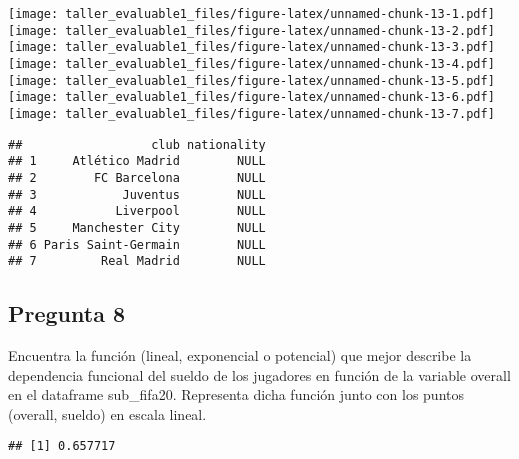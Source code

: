 \documentclass[
]{article}
\newenvironment{Shaded}{\begin{snugshade}}{\end{snugshade}}
\newcommand{\KeywordTok}[1]{\textcolor[rgb]{0.13,0.29,0.53}{\textbf{#1}}}
\newcommand{\NormalTok}[1]{#1}
\newcommand{\OperatorTok}[1]{\textcolor[rgb]{0.81,0.36,0.00}{\textbf{#1}}}
\begin{document}
\texttt{[image: taller\_evaluable1\_files/figure-latex/unnamed-chunk-13-1.pdf]}
\texttt{[image: taller\_evaluable1\_files/figure-latex/unnamed-chunk-13-2.pdf]}
\texttt{[image: taller\_evaluable1\_files/figure-latex/unnamed-chunk-13-3.pdf]}
\texttt{[image: taller\_evaluable1\_files/figure-latex/unnamed-chunk-13-4.pdf]}
\texttt{[image: taller\_evaluable1\_files/figure-latex/unnamed-chunk-13-5.pdf]}
\texttt{[image: taller\_evaluable1\_files/figure-latex/unnamed-chunk-13-6.pdf]}
\texttt{[image: taller\_evaluable1\_files/figure-latex/unnamed-chunk-13-7.pdf]}

\begin{verbatim}
##                  club nationality
## 1     Atlético Madrid        NULL
## 2        FC Barcelona        NULL
## 3            Juventus        NULL
## 4           Liverpool        NULL
## 5     Manchester City        NULL
## 6 Paris Saint-Germain        NULL
## 7         Real Madrid        NULL
\end{verbatim}

\hypertarget{pregunta-8}{%
\subsection{Pregunta 8}\label{pregunta-8}}

Encuentra la función (lineal, exponencial o potencial) que mejor
describe la dependencia funcional del sueldo de los jugadores en función
de la variable overall en el dataframe sub\_fifa20. Representa dicha
función junto con los puntos (overall, sueldo) en escala lineal.

\begin{Shaded}
\end{Shaded}

\begin{verbatim}
## [1] 0.657717
\end{verbatim}

\begin{Shaded}
\end{Shaded}
\end{document}

